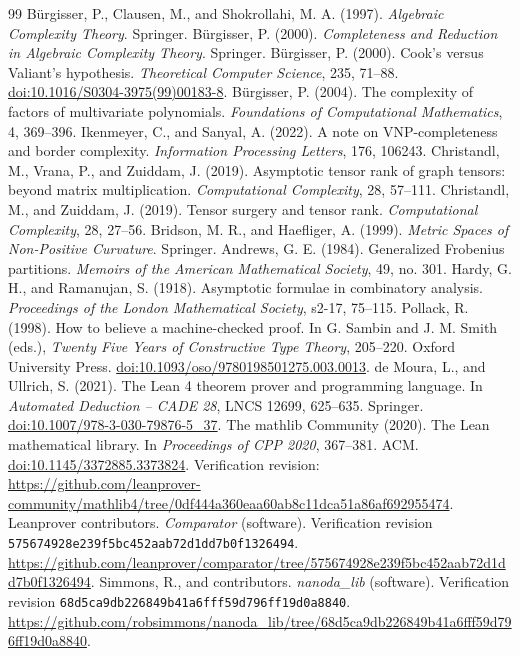 \documentclass[11pt,letterpaper]{article}
\theoremstyle{definition}\newtheorem{definition}[theorem]{Definition}\newtheorem{example}[theorem]{Example}
\theoremstyle{remark}\newtheorem{remark}[theorem]{Remark}
\begin{document}
\begin{thebibliography}{99}
 B\"urgisser, P., Clausen, M., and Shokrollahi, M. A. (1997). \emph{Algebraic Complexity Theory}. Springer.
 B\"urgisser, P. (2000). \emph{Completeness and Reduction in Algebraic Complexity Theory}. Springer.
 B\"urgisser, P. (2000). Cook's versus Valiant's hypothesis. \emph{Theoretical Computer Science}, 235, 71--88. \href{https://doi.org/10.1016/S0304-3975(99)00183-8}{doi:10.1016/S0304-3975(99)00183-8}.
 B\"urgisser, P. (2004). The complexity of factors of multivariate polynomials. \emph{Foundations of Computational Mathematics}, 4, 369--396.
 Ikenmeyer, C., and Sanyal, A. (2022). A note on VNP-completeness and border complexity. \emph{Information Processing Letters}, 176, 106243.
 Christandl, M., Vrana, P., and Zuiddam, J. (2019). Asymptotic tensor rank of graph tensors: beyond matrix multiplication. \emph{Computational Complexity}, 28, 57--111.
 Christandl, M., and Zuiddam, J. (2019). Tensor surgery and tensor rank. \emph{Computational Complexity}, 28, 27--56.
 Bridson, M. R., and Haefliger, A. (1999). \emph{Metric Spaces of Non-Positive Curvature}. Springer.
 Andrews, G. E. (1984). Generalized Frobenius partitions. \emph{Memoirs of the American Mathematical Society}, 49, no. 301.
 Hardy, G. H., and Ramanujan, S. (1918). Asymptotic formulae in combinatory analysis. \emph{Proceedings of the London Mathematical Society}, s2-17, 75--115.
 Pollack, R. (1998). How to believe a machine-checked proof. In G. Sambin and J. M. Smith (eds.), \emph{Twenty Five Years of Constructive Type Theory}, 205--220. Oxford University Press. \href{https://doi.org/10.1093/oso/9780198501275.003.0013}{doi:10.1093/oso/9780198501275.003.0013}.
 de Moura, L., and Ullrich, S. (2021). The Lean 4 theorem prover and programming language. In \emph{Automated Deduction -- CADE 28}, LNCS 12699, 625--635. Springer. \href{https://doi.org/10.1007/978-3-030-79876-5_37}{doi:10.1007/978-3-030-79876-5\_37}.
 The mathlib Community (2020). The Lean mathematical library. In \emph{Proceedings of CPP 2020}, 367--381. ACM. \href{https://doi.org/10.1145/3372885.3373824}{doi:10.1145/3372885.3373824}. Verification revision: \url{https://github.com/leanprover-community/mathlib4/tree/0df444a360eaa60ab8c11dca51a86af692955474}.
 Leanprover contributors. \emph{Comparator} (software). Verification revision \nolinkurl{575674928e239f5bc452aab72d1dd7b0f1326494}. \url{https://github.com/leanprover/comparator/tree/575674928e239f5bc452aab72d1dd7b0f1326494}.
 Simmons, R., and contributors. \emph{nanoda\_lib} (software). Verification revision \nolinkurl{68d5ca9db226849b41a6fff59d796ff19d0a8840}. \url{https://github.com/robsimmons/nanoda_lib/tree/68d5ca9db226849b41a6fff59d796ff19d0a8840}.

\end{thebibliography}
\end{document}
